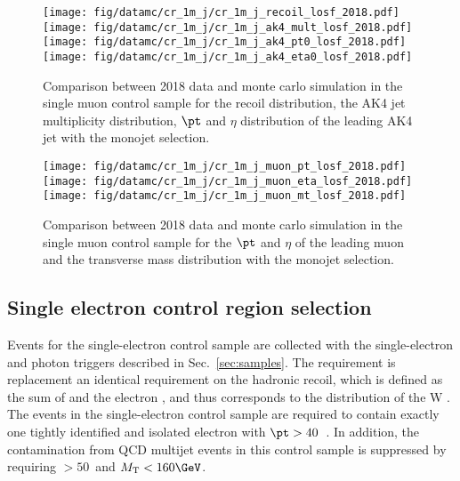 \begin{figure}[htbp]
    \begin{center}
        \texttt{[image: fig/datamc/cr\_1m\_j/cr\_1m\_j\_recoil\_losf\_2018.pdf]}
        \texttt{[image: fig/datamc/cr\_1m\_j/cr\_1m\_j\_ak4\_mult\_losf\_2018.pdf]} \\
        \texttt{[image: fig/datamc/cr\_1m\_j/cr\_1m\_j\_ak4\_pt0\_losf\_2018.pdf]}
        \texttt{[image: fig/datamc/cr\_1m\_j/cr\_1m\_j\_ak4\_eta0\_losf\_2018.pdf]}
    \end{center}
    \caption{Comparison between 2018 data and monte carlo simulation in the single muon control sample for
        the recoil distribution, the AK4 jet multiplicity distribution,  $\pt$ and $\eta$ distribution
        of the leading AK4  jet with the monojet selection.}
    \label{fig:SM_monojet_2018}
\end{figure}

\begin{figure}[htbp]
    \begin{center}
        \texttt{[image: fig/datamc/cr\_1m\_j/cr\_1m\_j\_muon\_pt\_losf\_2018.pdf]}
        \texttt{[image: fig/datamc/cr\_1m\_j/cr\_1m\_j\_muon\_eta\_losf\_2018.pdf]} \\
        \texttt{[image: fig/datamc/cr\_1m\_j/cr\_1m\_j\_muon\_mt\_losf\_2018.pdf]}
    \end{center}
    \caption{Comparison between 2018 data and monte carlo simulation in the single muon control sample for
        the $\pt$ and $\eta$ of the leading muon and the transverse mass distribution with the monojet selection.}
    \label{fig:SM_2_monojet_2018}
\end{figure}

\newpage

\subsection{Single electron control region selection}
\label{sec:selection_cr_1e}
Events for the single-electron control sample are collected with the single-electron and photon triggers described in Sec.~\ref{sec:samples}.  The \ptmiss requirement is replacement an identical requirement on the hadronic recoil, which is defined as the sum of \ptvecmiss and the electron \vpt, and thus corresponds to the distribution of the W \pt.
The events in the single-electron control sample are required to contain exactly one tightly identified and isolated electron with $\pt > 40$~\GeV.
In addition, the contamination from QCD multijet events in this control sample is suppressed by requiring \MET$ > 50$~\GeV and $\mt < 160 \GeV$.

